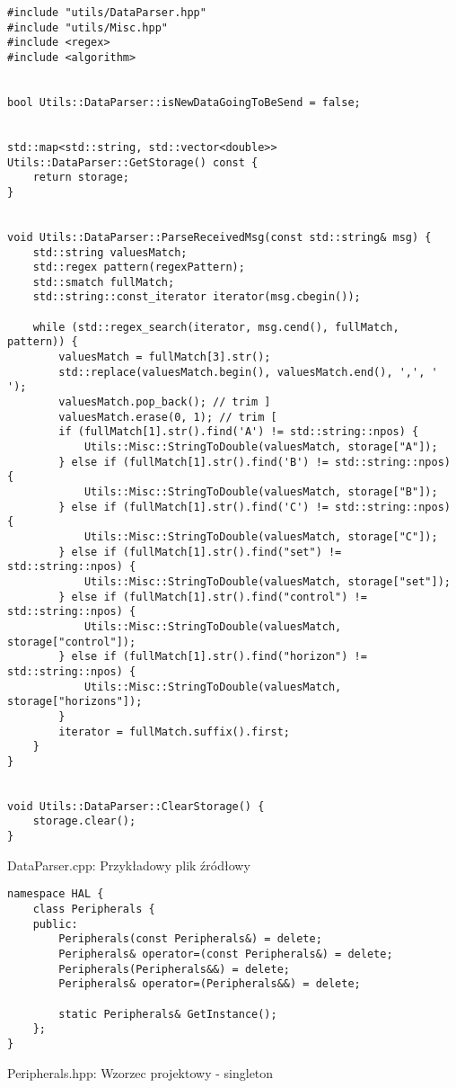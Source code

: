 \begin{listing}[htb]
\begin{verbatim}
#include "utils/DataParser.hpp"
#include "utils/Misc.hpp"
#include <regex>
#include <algorithm>


bool Utils::DataParser::isNewDataGoingToBeSend = false;


std::map<std::string, std::vector<double>> Utils::DataParser::GetStorage() const {
    return storage;
}


void Utils::DataParser::ParseReceivedMsg(const std::string& msg) {
    std::string valuesMatch;
    std::regex pattern(regexPattern);
    std::smatch fullMatch;
    std::string::const_iterator iterator(msg.cbegin());

    while (std::regex_search(iterator, msg.cend(), fullMatch, pattern)) {
        valuesMatch = fullMatch[3].str();
        std::replace(valuesMatch.begin(), valuesMatch.end(), ',', ' ');
        valuesMatch.pop_back(); // trim ]
        valuesMatch.erase(0, 1); // trim [
        if (fullMatch[1].str().find('A') != std::string::npos) {
            Utils::Misc::StringToDouble(valuesMatch, storage["A"]);
        } else if (fullMatch[1].str().find('B') != std::string::npos) {
            Utils::Misc::StringToDouble(valuesMatch, storage["B"]);
        } else if (fullMatch[1].str().find('C') != std::string::npos) {
            Utils::Misc::StringToDouble(valuesMatch, storage["C"]);
        } else if (fullMatch[1].str().find("set") != std::string::npos) {
            Utils::Misc::StringToDouble(valuesMatch, storage["set"]);
        } else if (fullMatch[1].str().find("control") != std::string::npos) {
            Utils::Misc::StringToDouble(valuesMatch, storage["control"]);
        } else if (fullMatch[1].str().find("horizon") != std::string::npos) {
            Utils::Misc::StringToDouble(valuesMatch, storage["horizons"]);
        }
        iterator = fullMatch.suffix().first;
    }
}


void Utils::DataParser::ClearStorage() {
    storage.clear();
}

\end{verbatim}
\caption{DataParser.cpp: Przykładowy plik źródłowy}
\label{lst:source_example`}
\end{listing}

\begin{listing}[htb]
\begin{verbatim}
namespace HAL {
    class Peripherals {
    public:
        Peripherals(const Peripherals&) = delete;
        Peripherals& operator=(const Peripherals&) = delete;
        Peripherals(Peripherals&&) = delete;
        Peripherals& operator=(Peripherals&&) = delete;

        static Peripherals& GetInstance();
    };
}
\end{verbatim}
\caption{Peripherals.hpp: Wzorzec projektowy - singleton}
\label{lst:singleton_hpp`}
\end{listing}

